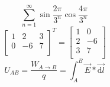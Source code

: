 \documentclass[12pt, a4paper]{article}
\begin{document}
\begin{equation}
\sum^{\infty}_{n=1} \sin \frac{2 \pi}{3^n} \cos \frac{4 \pi}{3^n}
\end{equation}
\begin{equation}
\left[
\begin{array}{lll}
1 & 2 & 3 \\
0 & -6 & 7 \\
\end{array}
\right]
^T
=
\left[
\begin{array}{ll}
1 & 0 \\
2 & -6  \\
3 & 7  \\
\end{array}
\right]
\end{equation}
\begin{equation}
U_{AB} = \frac{W_{A \rightarrow B}}{q} = \int^{B}_{A} \vec{E} * \vec{\mathrm{d}l}
\end{equation}
\end{document}
